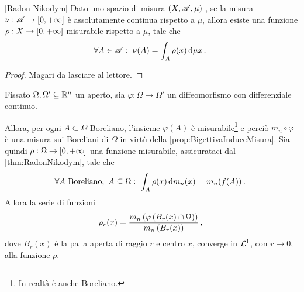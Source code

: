 \begin{theorem}\label{thm:RadonNikodym} [Radon-Nikodym]
	Dato uno spazio di misura $(X,\mathscr A,\mu)$ \sigfin[o], se la misura $\nu:\mathscr A\to[0,+\infty]$ è assolutamente continua rispetto a $\mu$, allora esiste una funzione $\rho:X\to[0,+\infty]$ misurabile rispetto a $\mu$, tale che
	\begin{equation*}
		\forall A\in\mathscr A:\ \nu(A)=\int_A \rho(x)\,\mathrm d\mu x\, \text{. }
	\end{equation*}
\end{theorem}
\begin{proof}
	Magari da lasciare al lettore.
\end{proof}

\begin{lemma}\label{lemma:LimiteDensita}%
	Fissato $\Omega,\Omega'\subseteq\mathbb R^n$ un aperto, sia $\varphi:\Omega\to\Omega'$ un diffeomorfismo con differenziale continuo.
	
	Allora, per ogni $A\subset\Omega$ Boreliano, l'insieme $\varphi(A)$ è misurabile\footnote{In realtà è anche Boreliano.} e perciò $m_n\circ\varphi$ è una misura sui Boreliani di $\Omega$ in virtù della \cref{prop:BigettivaInduceMisura}.
	Sia quindi $\rho:\Omega\to[0,+\infty]$ una funzione misurabile, assicurataci dal \cref{thm:RadonNikodym}, tale che
	\begin{equation*}
		\forall A\ \text{Boreliano},\ A\subseteq \Omega:\ \int_A \rho(x)\de m_n(x)=m_n(f(A)) \punto
	\end{equation*}
	Allora la serie di funzioni
	\begin{equation*}
		\rho_r(x)=\frac{m_n\left(\varphi\left(B_r(x)\cap \Omega\right)\right)}{m_n\left(B_r(x)\right)}\, \text{, }
	\end{equation*}
	dove $B_r(x)$ è la palla aperta di raggio $r$ e centro $x$, converge in $\mathcal L^1$, con $r\to 0$, alla funzione $\rho$.
\end{lemma}
